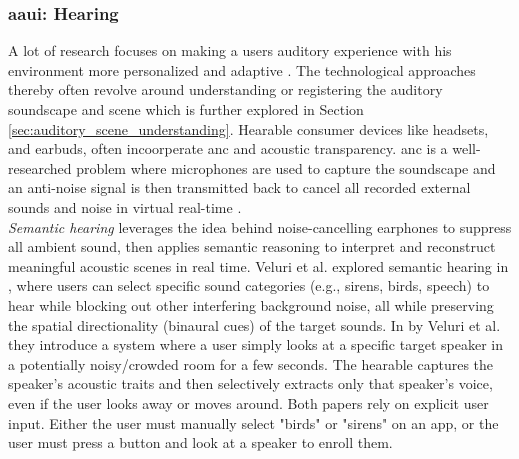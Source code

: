 \subsubsection{\gls{aaui}: Hearing}
\label{sec:aaui_hearing}
A lot of research focuses on making a users auditory experience with his environment more personalized and adaptive \cite{Haas_20_TargetAudioPersonalSoundscapeHearables}. The technological approaches thereby often revolve around understanding or registering the auditory soundscape and scene which is further explored in Section \ref{sec:auditory_scene_understanding}.
Hearable consumer devices like headsets, and earbuds, often incoorperate \gls{anc} and acoustic transparency.
\gls{anc} is a well-researched problem where microphones are used to capture the soundscape and an anti-noise signal is then transmitted back to cancel all recorded external sounds and noise in virtual real-time \cite{Shen_18_ANC}.\\
\textit{Semantic hearing} leverages the idea behind noise-cancelling earphones to suppress all ambient sound, then applies semantic reasoning to interpret and reconstruct meaningful acoustic scenes in real time. Veluri et al. explored semantic hearing in \cite{Veluri_23_SemanticHearing}, where users can select specific sound categories (e.g., sirens, birds, speech) to hear while blocking out  other interfering background noise, all while preserving the spatial directionality (binaural cues) of the target sounds. In \cite{Veluri_24_LookOnceToHearTargetSpeech} by Veluri et al. they introduce a system where a user simply looks at a specific target speaker in a potentially noisy/crowded room for a few seconds. The hearable captures the speaker's acoustic traits and then selectively extracts only that speaker's voice, even if the user looks away or moves around. Both papers rely on explicit user input. Either the user must manually select "birds" or "sirens" on an app, or the user must press a button and look at a speaker to enroll them. %
